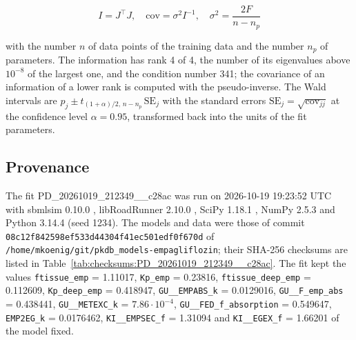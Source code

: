 \documentclass{article}
\begin{document}
\begin{equation}
I = J^\top J, \quad \mathrm{cov} = \sigma^2 I^{-1}, \quad \sigma^2 = \frac{2 F}{n - n_p}
\end{equation}

with the number $n$ of data points of the training data and the number $n_p$ of parameters. The information has rank 4 of 4, the number of its eigenvalues above $10^{-8}$ of the largest one, and the condition number 341; the covariance of an information of a lower rank is computed with the pseudo-inverse. The Wald intervals are $\hat{p}_j \pm t_{(1+\alpha)/2,\, n-n_p}\, \mathrm{SE}_j$ with the standard errors $\mathrm{SE}_j = \sqrt{\mathrm{cov}_{jj}}$ at the confidence level $\alpha = 0.95$, transformed back into the units of the fit parameters.

\subsection{Provenance}

The fit PD\_20261019\_212349\_\_c28ac was run on 2026-10-19 19:23:52 UTC with sbmlsim 0.10.0 \cite{Koenig2026_sbmlsim}, libRoadRunner 2.10.0 \cite{Welsh2023}, SciPy 1.18.1 \cite{Virtanen2020}, NumPy 2.5.3 \cite{Harris2020} and Python 3.14.4 (seed 1234). The models and data were those of commit \texttt{08c12f842598ef533d44304f41ec501edf0f670d} of \texttt{/home/mkoenig/git/pkdb\_models-empagliflozin}; their SHA-256 checksums are listed in Table~\ref{tab:checksums:PD_20261019_212349__c28ac}. The fit kept the values \texttt{ftissue\_emp} = 1.11017, \texttt{Kp\_emp} = 0.23816, \texttt{ftissue\_deep\_emp} = 0.112609, \texttt{Kp\_deep\_emp} = 0.418947, \texttt{GU\_\_EMPABS\_k} = 0.0129016, \texttt{GU\_\_F\_emp\_abs} = 0.438441, \texttt{GU\_\_METEXC\_k} = $7.86 \cdot 10^{-4}$, \texttt{GU\_\_FED\_f\_absorption} = 0.549647, \texttt{EMP2EG\_k} = 0.0176462, \texttt{KI\_\_EMPSEC\_f} = 1.31094 and \texttt{KI\_\_EGEX\_f} = 1.66201 of the model fixed.
\end{document}
